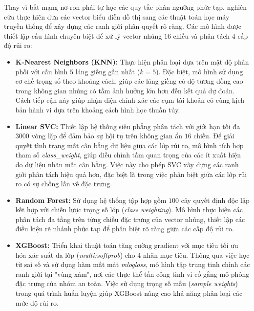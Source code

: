 Thay vì bắt mạng nơ-ron phải tự học các quy tắc phân ngưỡng phức tạp, nghiên cứu thực hiên đưa các vector biểu diễn đồ thị sang các thuật toán học máy truyền thống để xây dựng các ranh giới phân quyết rõ ràng. Các mô hình được thiết lập cấu hình chuyên biệt để xử lý vector nhúng $16$ chiều và phân tách $4$ cấp độ rủi ro:

\begin{itemize}[label={--}, itemsep=1pt]
    \item \textbf{K-Nearest Neighbors (KNN):} Thực hiện phân loại dựa trên mật độ phân phối với cấu hình $5$ láng giềng gần nhất ($k=5$). Đặc biệt, mô hình sử dụng cơ chế trọng số theo khoảng cách, giúp các láng giềng có độ tương đồng cao trong không gian nhúng có tầm ảnh hưởng lớn hơn đến kết quả dự đoán. Cách tiếp cận này giúp nhận diện chính xác các cụm tài khoản có cùng kịch bản hành vi dựa trên khoảng cách hình học thuần túy.
    
    \item \textbf{Linear SVC:} Thiết lập hệ thống siêu phẳng phân tách với giới hạn tối đa $3000$ vòng lặp để đảm bảo sự hội tụ trên không gian ẩn $16$ chiều. Để giải quyết tình trạng mất cân bằng dữ liệu giữa các lớp rủi ro, mô hình tích hợp tham số \textit{class\_weight}, giúp điều chỉnh tầm quan trọng của các ít xuất hiện do dữ liệu nhãn mất cân bằng. Việc này cho phép SVC xây dựng các ranh giới phân tách hiệu quả hơn, đặc biệt là trong việc phân biệt giữa các lớp rủi ro có sự chồng lấn về đặc trưng.
    
    \item \textbf{Random Forest:} Sử dụng hệ thống tập hợp gồm $100$ cây quyết định độc lập kết hợp với chiến lược trọng số lớp (\textit{class weighting}). Mô hình thực hiện các phân tách đa tầng trên từng chiều đặc trưng của vector nhúng, thiết lập các điều kiện rẽ nhánh phức tạp để phân biệt rõ ràng giữa các cấp độ rủi ro.
    
    \item \textbf{XGBoost:} Triển khai thuật toán tăng cường gradient với mục tiêu tối ưu hóa xác suất đa lớp (\textit{multi:softprob}) cho $4$ nhãn mục tiêu. Thông qua việc học từ sai số và sử dụng hàm mất mát \textit{mlogloss}, mô hình tập trung tinh chỉnh các ranh giới tại "vùng xám", nơi các thực thể tấn công tinh vi cố gắng mô phỏng đặc trưng của nhóm an toàn. Việc sử dụng trọng số mẫu (\textit{sample weights}) trong quá trình huấn luyện giúp XGBoost nâng cao khả năng phân loại các mức độ rủi ro.
\end{itemize}